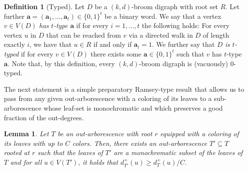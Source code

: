 \documentclass[a4paper,11pt]{article}
\newtheorem{lemma}[theorem]{\bf Lemma}
\theoremstyle{definition}
\newtheorem{definition}[theorem]{\bf Definition}
\begin{document}
\begin{definition}[Typed]
    Let $D$ be a $(k,d)$-broom digraph with root set $R$. Let further $\mathbf{a}=(\mathbf{a}_1,\ldots,\mathbf{a}_t)\in \{0,1\}^{t}$ be a binary word. We say that a vertex $v\in V(D)$ \emph{has $t$-type $\mathbf{a}$} if for every $i=1,\ldots,t$ the following holds: For every vertex $u$ in $D$ that can be reached from $v$ via a directed walk in $D$ of length exactly $i$, we have that $u\in R$ if and only if $\mathbf{a}_{i}=1$. We further say that \emph{$D$ is $t$-typed} if for every $v\in V(D)$ there exists some $\mathbf{a}\in \{0,1\}^{t}$ such that $v$ has $t$-type $\mathbf{a}$. 
    Note that, by this definition, every $(k,d)$-broom digraph is (vacuously) $0$-typed.
\end{definition}
The next statement is a simple preparatory Ramsey-type result that allows us to pass from any given out-arborescence with a coloring of its leaves to a sub-arborescence whose leaf-set is monochromatic and which preserves a good fraction of the out-degrees.
\begin{lemma}\label{lem:monochromatic}
     Let $T$ be an out-arborescence with root $r$ equipped with a coloring of its leaves with up to $C$ colors. Then, there exists an out-arborescence $T'\subseteq T$ rooted at $r$ such that the leaves of $T'$ are a monochromatic subset of the leaves of $T$ and for all $u\in V(T')$, it holds that $d_{T'}^+(u)\geq d_T^+(u)/C$.
\end{lemma}
\end{document}
